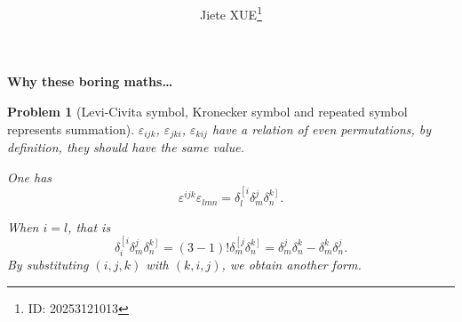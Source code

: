 \documentclass{article}
\title{\textbf{\mytitle}}
\author{Jiete XUE\thanks{ID: 20253121013}}
\date{\mydate}
\theoremstyle{1}
\newtheorem{problem}{Problem}
\begin{document}
\maketitle
\begin{center}
    {\Large\textbf{Why these boring maths…}}
\end{center}
\begin{problem}[Levi-Civita symbol, Kronecker symbol and repeated
symbol represents summation]


\hspace{12pt} $\varepsilon_{ijk}$, $\varepsilon_{jki}$, $\varepsilon_{kij}$ have a relation of even permutations, by definition, they should have the same value.

One has
\begin{equation}
    \varepsilon^{ijk} \varepsilon_{lmn} = \delta^{\left[i\right.}_{l}\delta^{j}_{m}\delta^{\left.k\right]}_{n}.
\end{equation}

When $i=l$, that is
\begin{equation}
    \delta^{\left[i\right.}_{i}\delta^{j}_{m}\delta^{\left.k\right]}_{n} = (3-1)! \delta^{\left[j\right.}_{m}\delta^{\left.k\right]}_{n} = \delta^j_m \delta^k_n - \delta^k_m \delta^j_n.
\end{equation}
By substituting $(i,j,k)$ with $(k,i,j)$, we obtain another form.
\end{problem}
\end{document}
